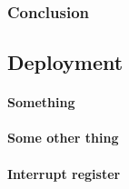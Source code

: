 \subsubsection{Conclusion}



\subsection{Deployment}
\paragraph{Something}
\paragraph{Some other thing}
\paragraph{Interrupt register}
